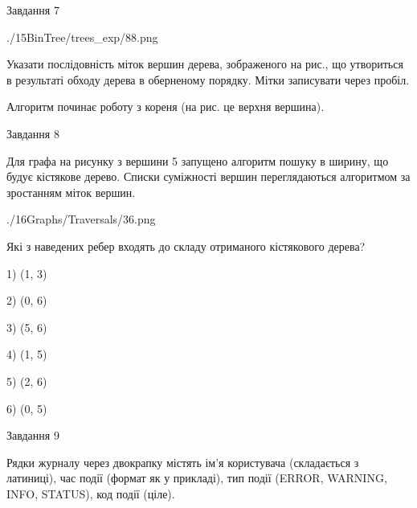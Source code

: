 \documentclass[12pt, ukrainian]{article}
\begin{document}
{\vspace{10mm}\par

\newpage
\begin{minipage}[t]{9.7cm}
               
{\begin{center}Завдання {7}\end{center}}
\vspace{-6mm}

\begin{center}
	{./15BinTree/trees_exp/88.png}
\end{center}
Указати послідовність міток вершин дерева, зображеного на рис., що утвориться в результаті обходу дерева в оберненому порядку. Мітки записувати через пробіл.\par Алгоритм починає роботу з кореня (на рис. це верхня вершина).\par

\end{minipage}
\vline \hspace{8mm}
\begin{minipage}[t]{8.0cm}
               
{\begin{center}Завдання {8}\end{center}}
\vspace{-6mm}
Для графа на рисунку з вершини 5 запущено алгоритм пошуку в ширину, що будує кістякове дерево. Списки суміжності вершин переглядаються алгоритмом за зростанням міток вершин.\par
\begin{center}
	{./16Graphs/Traversals/36.png}
\end{center}
\par Які з наведених ребер входять до складу отриманого кістякового дерева?\par
1) (1, 3)\par
2) (0, 6)\par
3) (5, 6)\par
4) (1, 5)\par
5) (2, 6)\par
6) (0, 5)\par
{\vskip 15pt} \par

\end{minipage}

               
{\begin{center}Завдання {9}\end{center}}
\vspace{-6mm}
Рядки журналу через двокрапку містять ім'я користувача (складається з латиниці), час події (фор\-мат як у прикладі), тип події (ERROR, WARNING, INFO, STATUS), код події (ціле).

}
\end{document}
